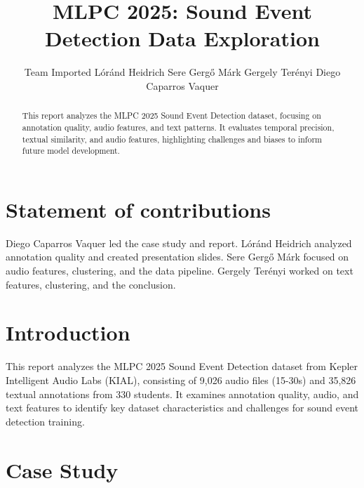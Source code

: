 \documentclass{article}
\title{MLPC 2025: Sound Event Detection Data Exploration}
\author{
  Team Imported \AND
  Lóránd Heidrich
  \And
  Sere Gergő Márk
  \And 
  Gergely Terényi
  \And 
  Diego Caparros Vaquer
}
\begin{document}
\maketitle
\section{Statement of contributions}
Diego Caparros Vaquer led the case study and report. Lóránd Heidrich analyzed annotation quality and created presentation slides. Sere Gergő Márk focused on audio features, clustering, and the data pipeline. Gergely Terényi worked on text features, clustering, and the conclusion.

\begin{abstract}
This report analyzes the MLPC 2025 Sound Event Detection dataset, focusing on annotation quality, audio features, and text patterns. It evaluates temporal precision, textual similarity, and audio features, highlighting challenges and biases to inform future model development.
\end{abstract}

\section{Introduction}

This report analyzes the MLPC 2025 Sound Event Detection dataset from Kepler Intelligent Audio Labs (KIAL), consisting of 9,026 audio files (15-30s) and 35,826 textual annotations from 330 students. It examines annotation quality, audio, and text features to identify key dataset characteristics and challenges for sound event detection training.

\section{Case Study}
\label{sec:case_study}

\begin{table}[H]
  \caption{Conclusions}
  \label{tab:text_similarity}
  \centering
\end{table}
\end{document}
